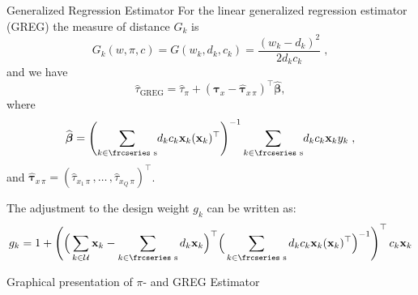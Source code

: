 \documentclass[10pt]{beamer}\usepackage[]{graphicx}\usepackage[]{color}
\newenvironment{knitrout}{}{} %
\newcommand{\textfrc}[1]{{\frcseries#1}}
\newcommand{\mathfrc}[1]{\text{\textfrc{#1}}}
\begin{document}
\begin{frame}{Generalized Regression Estimator}
For the linear generalized regression estimator (GREG) the measure of distance $G_k$ is
$$G_k(w,\pi,c)=G(w_k,d_k,c_k)=\dfrac{(w_k - d_k)^2}{2 d_k c_k} \;,$$
and we have
\begin{equation*}
\hat{\tau}_\text{GREG}= \hat{\tau}_\pi + \left( \boldsymbol{\tau}_{x}-
\hat{\boldsymbol{\tau}}_{x\,\pi}\right)^\top \widehat{\boldsymbol\beta},
\end{equation*}
where
\begin{equation*}
\widehat{\boldsymbol\beta}=\left( \underset{k \in \mathfrc{s} }{\sum }d_{k} c_k \mathbf{x}_{k} (\mathbf{x}_{k})^\top \right)^{-1}\underset{k \in \mathfrc{s}}{\sum } d_{k} c_k \mathbf{x}_{k} y_{k}\;{,}
\end{equation*}
and $\hat{\boldsymbol{\tau}}_{x\,\pi}=(\hat{\tau}_{x_1\,\pi}\,,\ldots\,,\hat{\tau}_{x_Q\,\pi} )^\top $.

The  adjustment to the design weight $g_k$ can be written as:
\begin{gather*}
g_k = 1 + \left(\Big(\sum_{k\in\mathcal{U}} \mathbf{x}_k - \sum_{k\in \mathfrc{s}} d_k \mathbf{x}_k\Big)^\top \Big(\sum_{k\in\mathfrc{s}} d_k c_k \mathbf{x}_k (\mathbf{x}_k)^\top \Big)^{-1}\right)^\top c_k \mathbf{x}_k
\end{gather*}
\end{frame}





\begin{frame}{Graphical presentation of $\pi$- and GREG Estimator}
 ~\\[-1.5cm]
\begin{knitrout}\footnotesize
{}\color{fgcolor}











{\centering {}

}



\end{knitrout}
\end{frame}
\end{document}
